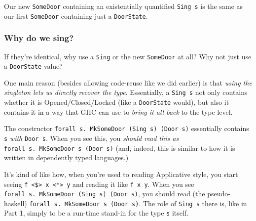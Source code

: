 \documentclass[]{article}
\begin{document}
Our new \texttt{SomeDoor} containing an existentially quantified
\texttt{Sing\ s} is the same as our first \texttt{SomeDoor} containing just a
\texttt{DoorState}.

\hypertarget{why-do-we-sing}{%
\subsubsection{Why do we sing?}\label{why-do-we-sing}}

If they're identical, why use a \texttt{Sing} or the new \texttt{SomeDoor} at
all? Why not just use a \texttt{DoorState} value?

One main reason (besides allowing code-reuse like we did earlier) is that
\emph{using the singleton lets us directly recover the type}. Essentially, a
\texttt{Sing\ s} not only contains whether it is Opened/Closed/Locked (like a
\texttt{DoorState} would), but also it contains it in a way that GHC can use to
\emph{bring it all back} to the type level.

The constructor \texttt{forall\ s.\ MkSomeDoor\ (Sing\ s)\ (Door\ s)}
essentially contains \texttt{s} \emph{with} \texttt{Door\ s}. When you see this,
you \emph{should read this as} \texttt{forall\ s.\ MkSomeDoor\ s\ (Door\ s)}
(and, indeed, this is similar to how it is written in dependently typed
languages.)

It's kind of like how, when you're used to reading Applicative style, you start
seeing \texttt{f\ \textless{}\$\textgreater{}\ x\ \textless{}*\textgreater{}\ y}
and reading it like \texttt{f\ x\ y}. When you see
\texttt{forall\ s.\ MkSomeDoor\ (Sing\ s)\ (Door\ s)}, you should read (the
pseudo-haskell) \texttt{forall\ s.\ MkSomeDoor\ s\ (Door\ s)}. The role of
\texttt{Sing\ s} there is, like in Part 1, simply to be a run-time stand-in for
the type \texttt{s} itself.
\end{document}
